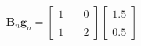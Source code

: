 \documentclass[preview]{standalone}
\begin{document}
\begin{align*}
\mathbf{B}_n \mathbf{g}_n = \begin{bmatrix} 1 & \quad 0 \\ \\1 & \quad 2 \end{bmatrix}\begin{bmatrix} 1.5 \\ \\ 0.5 \end{bmatrix}
\end{align*}
\end{document}
